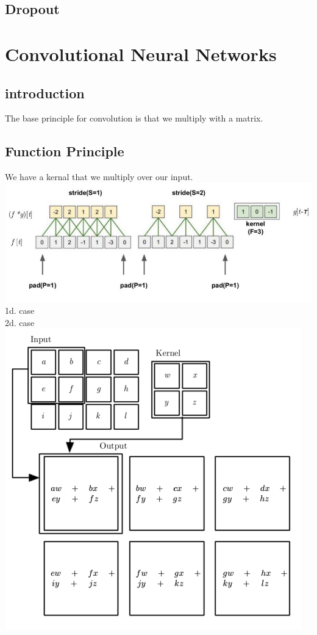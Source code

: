 \documentclass[a4paper,10pt,titlepage]{report}
\begin{document}
\subsection{Dropout}




\newpage
\section{Convolutional Neural Networks}

\subsection{introduction}
The base principle for convolution is that we multiply with a matrix.
\subsection{Function Principle}
We have a kernal that we multiply over our input.\\
\includegraphics[scale=0.1]{CNN.png}
1d. case\\

2d. case\\
\includegraphics[scale=0.1]{CNN2d.png}
\end{document}
